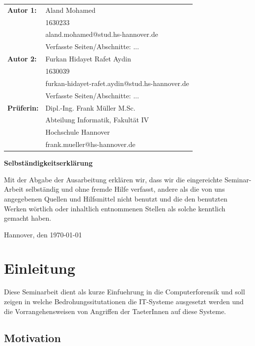 \documentclass[12pt,DIV=14, version=first, BCOR=10mm,a4paper,twoside,parskip=half-,headsepline,headinclude]{scrartcl}
\begin{document}
  \newpage \thispagestyle{empty}
 \begin{tabular}{ll}
{\bfseries\sffamily Autor 1:} &  Aland Mohamed \\ 
            & 1630233 \\
            & aland.mohamed@stud.hs-hannover.de \\
            & Verfasste Seiten/Abschnitte: ...
            \\[5ex]
{\bfseries\sffamily Autor 2:} & Furkan Hidayet Rafet Aydin \\ 
            & 1630039 \\
            & furkan-hidayet-rafet.aydin@stud.hs-hannover.de \\
           & Verfasste Seiten/Abschnitte: ... \\[5ex]
 {\bfseries\sffamily Prüferin:} &Dipl.-Ing. Frank Müller M.Sc. \\
          & Abteilung Informatik, Fakultät IV \\
         & Hochschule Hannover \\
        & frank.mueller@hs-hannover.de
\end{tabular}

\vfill

\begin{center} \sffamily\bfseries Selbständigkeitserklärung \end{center}

Mit der Abgabe der Ausarbeitung erklären wir, dass wir die eingereichte Seminar-Arbeit
selbständig und ohne fremde Hilfe verfasst, andere als die von uns angegebenen Quellen
und Hilfsmittel nicht benutzt und die den benutzten Werken wörtlich oder
inhaltlich entnommenen Stellen als solche kenntlich gemacht haben. 
\vspace*{7ex}

Hannover, den \today \hfill 

\pagebreak

  \tableofcontents  %
	\section{Einleitung}
	Diese Seminarbeit dient als kurze Einfuehrung in die Computerforensik und soll zeigen in welche Bedrohungssitutationen die IT-Systeme ausgesetzt werden und die Vorrangehensweisen von Angriffen der TaeterInnen auf diese Systeme.
	\subsection{Motivation}
	
\end{document}

